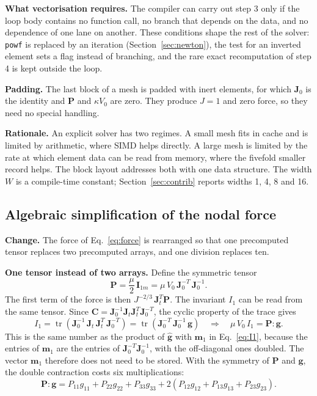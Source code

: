 \documentclass[11pt,a4paper]{article}
\newcommand{\code}[1]{\texttt{#1}}
\newcommand{\Jm}{J^{-2/3}}
\newcommand{\mat}[1]{\mathbf{#1}}
\begin{document}
\textbf{What vectorisation requires.} The compiler can carry out step 3 only if the loop body contains no function call, no branch that depends on the data, and no dependence of one lane on another. These conditions shape the rest of the solver: \code{powf} is replaced by an iteration (Section~\ref{sec:newton}), the test for an inverted element sets a flag instead of branching, and the rare exact recomputation of step 4 is kept outside the loop.

\textbf{Padding.} The last block of a mesh is padded with inert elements, for which $\mat{J}_0$ is the identity and $\mat{P}$ and $\kappa V_0$ are zero. They produce $J = 1$ and zero force, so they need no special handling.

\textbf{Rationale.} An explicit solver has two regimes. A small mesh fits in cache and is limited by arithmetic, where SIMD helps directly. A large mesh is limited by the rate at which element data can be read from memory, where the fivefold smaller record helps. The block layout addresses both with one data structure. The width $W$ is a compile-time constant; Section~\ref{sec:contrib} reports widths 1, 4, 8 and 16.

\subsection{Algebraic simplification of the nodal force}
\label{sec:algebra}

\textbf{Change.} The force of Eq.~\eqref{eq:force} is rearranged so that one precomputed tensor replaces two precomputed arrays, and one division replaces ten.

\textbf{One tensor instead of two arrays.} Define the symmetric tensor
\begin{equation}
\mat{P} = \frac{\mu}{2}\,\mat{I}_{1m} = \mu\,V_0\,\mat{J}_0^{-T}\,\mat{J}_0^{-1}.
\end{equation}
The first term of the force is then $\Jm\,\mat{J}_t^{T}\mat{P}$. The invariant $I_1$ can be read from the same tensor. Since $\mat{C} = \mat{J}_0^{-1}\mat{J}_t\mat{J}_t^{T}\mat{J}_0^{-T}$, the cyclic property of the trace gives
\begin{equation}
I_1 = \operatorname{tr}\!\left( \mat{J}_0^{-1}\,\mat{J}_t\,\mat{J}_t^{T}\,\mat{J}_0^{-T} \right) = \operatorname{tr}\!\left( \mat{J}_0^{-T}\,\mat{J}_0^{-1}\,\mat{g} \right) \quad\Longrightarrow\quad \mu\,V_0\,I_1 = \mat{P} : \mat{g}.
\end{equation}
This is the same number as the product of $\hat{\mat{g}}$ with $\mat{m}_1$ in Eq.~\eqref{eq:I1}, because the entries of $\mat{m}_1$ are the entries of $\mat{J}_0^{-T}\mat{J}_0^{-1}$, with the off-diagonal ones doubled. The vector $\mat{m}_1$ therefore does not need to be stored. With the symmetry of $\mat{P}$ and $\mat{g}$, the double contraction costs six multiplications:
\begin{equation}
\mat{P} : \mat{g} = P_{11}g_{11} + P_{22}g_{22} + P_{33}g_{33} + 2\left( P_{12}g_{12} + P_{13}g_{13} + P_{23}g_{23} \right).
\end{equation}
\end{document}
